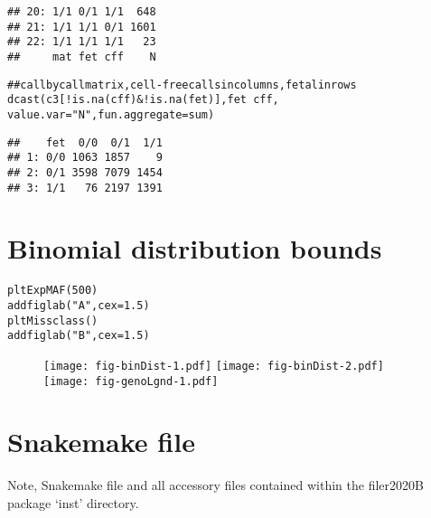 \documentclass{article}\usepackage[]{graphicx}\usepackage[]{color}
\makeatletter
\newcommand{\hlnum}[1]{\textcolor[rgb]{0.063,0.58,0.627}{#1}}%
\newcommand{\hlstr}[1]{\textcolor[rgb]{0.063,0.58,0.627}{#1}}%
\newcommand{\hlcom}[1]{\textcolor[rgb]{0.588,0.588,0.588}{#1}}%
\newcommand{\hlopt}[1]{\textcolor[rgb]{0.196,0.196,0.196}{#1}}%
\newcommand{\hlstd}[1]{\textcolor[rgb]{0.196,0.196,0.196}{#1}}%
\newcommand{\hlkwc}[1]{\textcolor[rgb]{0,0.631,0.314}{#1}}%
\newcommand{\hlkwd}[1]{\textcolor[rgb]{0.78,0.227,0.412}{#1}}%
\newenvironment{kframe}{%
 \def\at@end@of@kframe{}%
 \ifinner\ifhmode%
  \def\at@end@of@kframe{\end{minipage}}%
  \begin{minipage}{\columnwidth}%
 \fi\fi%
 \def\FrameCommand##1{\hskip\@totalleftmargin \hskip-\fboxsep
 \colorbox{shadecolor}{##1}\hskip-\fboxsep
     \hskip-\linewidth \hskip-\@totalleftmargin \hskip\columnwidth}%
 \MakeFramed {\advance\hsize-\width
   \@totalleftmargin\z@ \linewidth\hsize
   \@setminipage}}%
 {\par\unskip\endMakeFramed%
 \at@end@of@kframe}
\newenvironment{knitrout}{}{} %
\makeatother
\begin{document}
\begin{knitrout}
\begin{kframe}
\begin{verbatim}
## 20: 1/1 0/1 1/1  648
## 21: 1/1 1/1 0/1 1601
## 22: 1/1 1/1 1/1   23
##     mat fet cff    N
\end{verbatim}
\begin{alltt}
\hlcom{## call by call matrix, cell-free calls in columns, fetal in rows}
\hlkwd{dcast}\hlstd{(c3[}\hlopt{!}\hlkwd{is.na}\hlstd{(cff)} \hlopt{& !}\hlkwd{is.na}\hlstd{(fet)], fet} \hlopt{~} \hlstd{cff,}
      \hlkwc{value.var} \hlstd{=} \hlstr{"N"}\hlstd{,} \hlkwc{fun.aggregate} \hlstd{= sum)}
\end{alltt}
\begin{verbatim}
##    fet  0/0  0/1  1/1
## 1: 0/0 1063 1857    9
## 2: 0/1 3598 7079 1454
## 3: 1/1   76 2197 1391
\end{verbatim}
\end{kframe}
\end{knitrout}



\newpage
\section{Binomial distribution bounds}

\begin{knitrout}
\color{fgcolor}\begin{kframe}
\begin{alltt}
\hlkwd{pltExpMAF}\hlstd{(}\hlnum{500}\hlstd{)}
\hlkwd{addfiglab}\hlstd{(}\hlstr{"A"}\hlstd{,} \hlkwc{cex} \hlstd{=} \hlnum{1.5}\hlstd{)}
\hlkwd{pltMissclass}\hlstd{()}
\hlkwd{addfiglab}\hlstd{(}\hlstr{"B"}\hlstd{,} \hlkwc{cex} \hlstd{=} \hlnum{1.5}\hlstd{)}
\end{alltt}
\end{kframe}
\end{knitrout}

\begin{figure}
  \centering
  \texttt{[image: fig-binDist-1.pdf]}%
  \texttt{[image: fig-binDist-2.pdf]}
  \texttt{[image: fig-genoLgnd-1.pdf]}
\end{figure}

\section{Snakemake file}

Note, Snakemake file and all accessory files contained within the filer2020B package `inst' directory.
\end{document}
